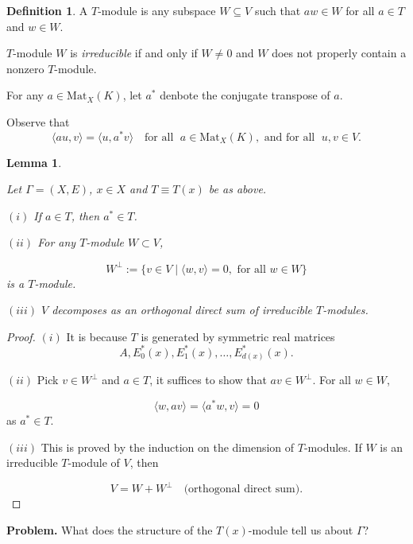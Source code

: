 \documentclass[
]{book}
\newtheorem{lemma}{Lemma}[chapter]
\theoremstyle{definition}
\newtheorem{definition}{Definition}[chapter]
\theoremstyle{definition}
\theoremstyle{definition}
\theoremstyle{definition}
\theoremstyle{remark}
\begin{document}
\begin{definition}
\protect\hypertarget{def:module}{}\label{def:module}A \(T\)-module  is any subspace \(W\subseteq V\) such that \(aw\in W\) for all \(a\in T\) and \(w\in W\).

\(T\)-module \(W\) is \emph{irreducible}  if and only if \(W\neq 0\) and \(W\) does not properly contain a nonzero \(T\)-module.
\end{definition}

For any \(a\in \mathrm{Mat}_X(K)\), let \(a^*\) denbote the conjugate transpose of \(a\).

Observe that
\[\langle au, v\rangle = \langle u, a^*v\rangle \quad \textrm{for all }\; a\in \mathrm{Mat}_X(K), \textrm{ and for all } \; u,v\in V.\]

\begin{lemma}
\protect\hypertarget{lem:complete-reducibility}{}\label{lem:complete-reducibility}

Let \(\Gamma = (X,E)\), \(x\in X\) and \(T \equiv T(x)\) be as above.

\((i)\) If \(a\in T\), then \(a^*\in T\).

\((ii)\) For any \(T\)-module \(W\subset V\),

\[W^\bot := \{v\in V\mid \langle w, v\rangle = 0, \textrm{ for all }w\in W\}\]
is a \(T\)-module.

\((iii)\) \(V\) decomposes as an orthogonal direct sum of irreducible \(T\)-modules.

\end{lemma}

\hfill\break

\begin{proof}
\((i)\) It is because \(T\) is generated by symmetric real matrices
\[A, E^*_0(x), E^*_1(x), \ldots, E^*_{d(x)}(x).\]

\((ii)\) Pick \(v\in W^\bot\) and \(a\in T\), it suffices to show that \(av\in W^\bot\). For all \(w\in W\),

\[\langle w, av\rangle = \langle a^*w, v\rangle = 0\]
as \(a^*\in T\).

\((iii)\) This is proved by the induction on the dimension of \(T\)-modules. If \(W\) is an irreducible \(T\)-module of \(V\), then

\[V = W + W^\bot \quad \textrm{(orthogonal direct sum)}.\]
\end{proof}

\textbf{Problem. }
What does the structure of the \(T(x)\)-module tell us about \(\Gamma\)?
\end{document}
